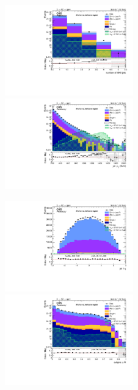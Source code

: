 \begin{figure}[!htb]
  \begin{center}
    \includegraphics[width=0.495\textwidth]{plots/v9_U/XVZnnInc/nFatJets.pdf}  
    \includegraphics[width=0.495\textwidth]{plots/v9_U/XVZnnInc/FatJet1_pt.pdf}
    
    \includegraphics[width=0.495\textwidth]{plots/v9_U/XVZnnInc/FatJet1_eta.pdf}
    \includegraphics[width=0.495\textwidth]{plots/v9_U/XVZnnInc/FatJet1_dR.pdf}


\end{center}
\end{figure}
